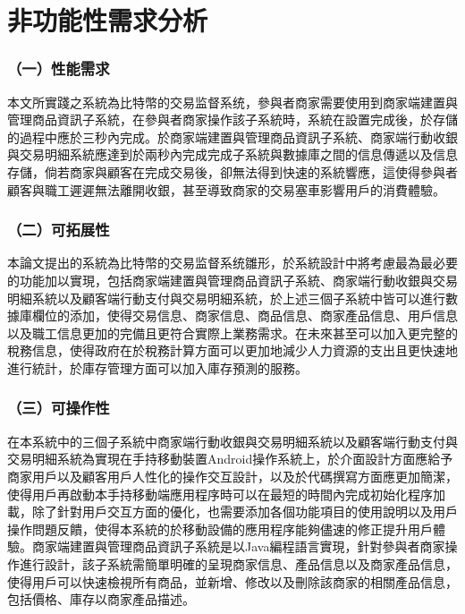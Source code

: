 	\section{非功能性需求分析}

	\subsubsection{（一）性能需求}
	
	本文所實踐之系統為比特幣的交易监督系统，參與者商家需要使用到商家端建置與管理商品資訊子系統，在參與者商家操作該子系統時，系統在設置完成後，於存儲的過程中應於三秒內完成。於商家端建置與管理商品資訊子系統、商家端行動收銀與交易明細系統應達到於兩秒內完成完成子系統與數據庫之間的信息傳遞以及信息存儲，倘若商家與顧客在完成交易後，卻無法得到快速的系統響應，這使得參與者顧客與職工遲遲無法離開收銀，甚至導致商家的交易塞車影響用戶的消費體驗。

	\subsubsection{（二）可拓展性}

	本論文提出的系統為比特幣的交易监督系统雛形，於系統設計中將考慮最為最必要的功能加以實現，包括商家端建置與管理商品資訊子系統、商家端行動收銀與交易明細系統以及顧客端行動支付與交易明細系統，於上述三個子系統中皆可以進行數據庫欄位的添加，使得交易信息、商家信息、商品信息、商家產品信息、用戶信息以及職工信息更加的完備且更符合實際上業務需求。在未來甚至可以加入更完整的稅務信息，使得政府在於稅務計算方面可以更加地減少人力資源的支出且更快速地進行統計，於庫存管理方面可以加入庫存預測的服務。

	\subsubsection{（三）可操作性}
	在本系統中的三個子系統中商家端行動收銀與交易明細系統以及顧客端行動支付與交易明細系統為實現在手持移動裝置Android操作系統上，於介面設計方面應給予商家用戶以及顧客用戶人性化的操作交互設計，以及於代碼撰寫方面應更加簡潔，使得用戶再啟動本手持移動端應用程序時可以在最短的時間內完成初始化程序加載，除了針對用戶交互方面的優化，也需要添加各個功能項目的使用說明以及用戶操作問題反饋，使得本系統的於移動設備的應用程序能夠儘速的修正提升用戶體驗。商家端建置與管理商品資訊子系統是以Java編程語言實現，針對參與者商家操作進行設計，該子系統需簡單明確的呈現商家信息、產品信息以及商家產品信息，使得用戶可以快速檢視所有商品，並新增、修改以及刪除該商家的相關產品信息，包括價格、庫存以商家產品描述。


